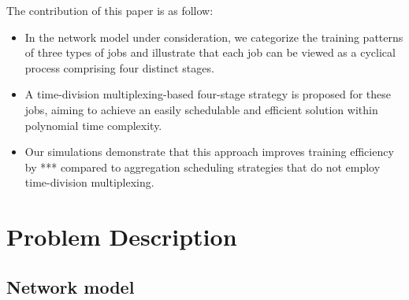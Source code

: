 \documentclass[conference]{IEEEtran}
\begin{document}
The contribution of this paper is as follow:

\begin{itemize}
	
	\item In the network model under consideration, we categorize the training patterns of three types of jobs and illustrate that each job can be viewed as a cyclical process comprising four distinct stages.
	
	
	\item A time-division multiplexing-based four-stage strategy is proposed for these jobs, aiming to achieve an easily schedulable and efficient solution within polynomial time complexity.
	
	
	\item Our simulations demonstrate that this approach improves training efficiency by *** compared to aggregation scheduling strategies that do not employ time-division multiplexing.
\end{itemize}

\section{Problem Description}

\subsection{Network model}
\end{document}
